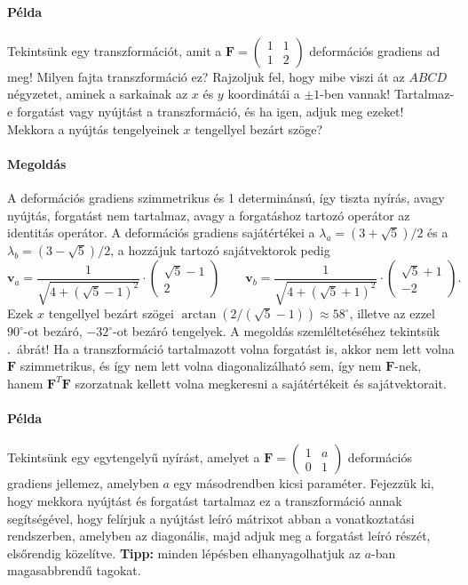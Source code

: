 \documentclass[12pt,a4paper]{scrartcl}
\let\mathbf\bm
\begin{document}
\footnotesize
\paragraph{Példa} Tekintsünk egy transzformációt, amit a ${\mathbf{F}} = \left( {\begin{array}{*{20}{c}}
  1&1 \\ 
  1&2 
\end{array}} \right)$ deformációs gradiens ad meg! Milyen fajta transzformáció ez? Rajzoljuk fel, hogy mibe viszi át az $ABCD$ négyzetet, aminek a sarkainak az $x$ és $y$ koordinátái a $\pm 1$-ben vannak! Tartalmaz-e forgatást vagy nyújtást a transzformáció, és ha igen, adjuk meg ezeket! Mekkora a nyújtás tengelyeinek $x$ tengellyel bezárt szöge?

\paragraph{Megoldás} A deformációs gradiens szimmetrikus és 1 determinánsú, így tiszta nyírás, avagy nyújtás, forgatást nem tartalmaz, avagy a forgatáshoz tartozó operátor az identitás operátor. A deformációs gradiens sajátértékei a $\lambda_a = \left( {3 + \sqrt 5 } \right)/2$ és a $\lambda_b = \left( {3 - \sqrt 5 } \right)/2$, a hozzájuk tartozó sajátvektorok pedig
\[{{\mathbf{v}}_a} = \frac{1}{{\sqrt {4 + {{\left( {\sqrt 5  - 1} \right)}^2}} }} \cdot \left( {\begin{array}{*{20}{c}}
  {\sqrt 5  - 1} \\ 
  2 
\end{array}} \right)\quad \quad {{\mathbf{v}}_b} = \frac{1}{{\sqrt {4 + {{\left( {\sqrt 5  + 1} \right)}^2}} }} \cdot \left( {\begin{array}{*{20}{c}}
  {\sqrt 5  + 1} \\ 
  { - 2} 
\end{array}} \right).\]
Ezek $x$ tengellyel bezárt szögei $\arctan \left( {2/\left( {\sqrt 5  - 1} \right)} \right) \approx 58^\circ $, illetve az ezzel  $90^\circ$-ot bezáró, $-32^\circ$-ot bezáró tengelyek. A megoldás szemléltetéséhez tekintsük .\ ábrát! Ha a transzformáció tartalmazott volna forgatást is, akkor nem lett volna ${\mathbf{F}}$ szimmetrikus, és így nem lett volna diagonalizálható sem, így nem ${\mathbf{F}}$-nek, hanem ${{\mathbf{F}}^T}{\mathbf{F}}$ szorzatnak kellett volna megkeresni a sajátértékeit és sajátvektorait.
\paragraph{Példa} Tekintsünk egy egytengelyű nyírást, amelyet a ${\mathbf{F}} = \left( {\begin{array}{*{20}{c}}
  1&a  \\ 
  0&1 
\end{array}} \right)$ deformációs gradiens jellemez, amelyben $a$ egy másodrendben kicsi paraméter. Fejezzük ki, hogy mekkora nyújtást és forgatást tartalmaz ez a transzformáció annak segítségével, hogy felírjuk a nyújtást leíró mátrixot abban a vonatkoztatási rendszerben, amelyben az diagonális, majd adjuk meg a forgatást leíró részét, elsőrendig közelítve. \textbf{Tipp:} minden lépésben elhanyagolhatjuk az $a$-ban magasabbrendű tagokat.
\end{document}

